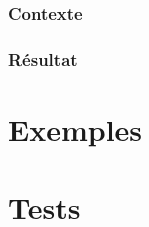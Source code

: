                 \subsubsection{Contexte}
                \subsubsection{Résultat}
                \subsubsection{}
        
        \section{Exemples}
        \section{Tests}
    
